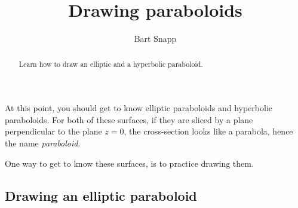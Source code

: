 \documentclass{ximera}
\author{Bart Snapp}
\title[Dig-In:]{Drawing paraboloids}
\begin{document}
\begin{abstract}
  Learn how to draw an elliptic and a hyperbolic paraboloid.
\end{abstract}
\maketitle

At this point, you should get to know elliptic paraboloids and 
hyperbolic paraboloids.
For both of these surfaces, if they are sliced by a plane
perpendicular to the plane $z=0$, the cross-section looks like a
parabola, hence the name \textit{paraboloid}.

One way to get to know these surfaces, is to practice drawing them.

\subsection{Drawing an elliptic paraboloid}
\end{document}
